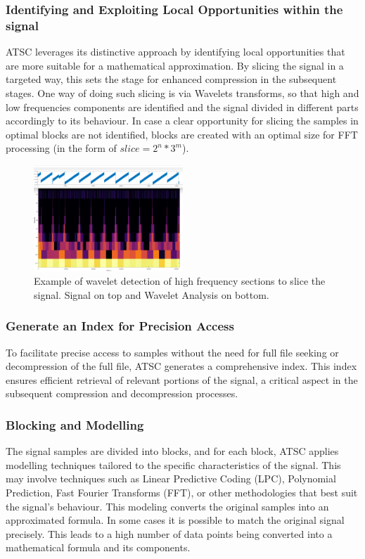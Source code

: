 \documentclass[conference]{IEEEtran}
\begin{document}
\vspace{10pt}
\subsubsection{Identifying and Exploiting Local Opportunities within the signal}
ATSC leverages its distinctive approach by identifying local opportunities that are more suitable for a mathematical approximation. By slicing the signal in a targeted way, this sets the stage for enhanced compression in the subsequent stages. One way of doing such slicing is via Wavelets transforms, so that high and low frequencies components are identified and the signal divided in different parts accordingly to its behaviour.
In case a clear opportunity for slicing the samples in optimal blocks are not identified, blocks are created with an optimal size for FFT processing (in the form of $slice = 2^n * 3^m$).

\begin{figure}[ht]
  \centering
  \includegraphics[width=0.5\textwidth]{wavelet_heap.png}
  \caption{Example of wavelet detection of high frequency sections to slice the signal. Signal on top and Wavelet Analysis on bottom.}
  \label{Fig.3}
\end{figure}
\vspace{5pt}

\vspace{10pt}
\subsubsection{Generate an Index for Precision Access}
To facilitate precise access to samples without the need for full file seeking or decompression of the full file, ATSC generates a comprehensive index. This index ensures efficient retrieval of relevant portions of the signal, a critical aspect in the subsequent compression and decompression processes.

\vspace{10pt}
\subsubsection{Blocking and Modelling}
The signal samples are divided into blocks, and for each block, ATSC applies modelling techniques tailored to the specific characteristics of the signal. This may involve techniques such as Linear Predictive Coding (LPC), Polynomial Prediction, Fast Fourier Transforms (FFT), or other methodologies that best suit the signal's behaviour. This modeling converts the original samples into an approximated formula. In some cases it is possible to match the original signal precisely. This leads to a high number of data points being converted into a mathematical formula and its components.
\end{document}
